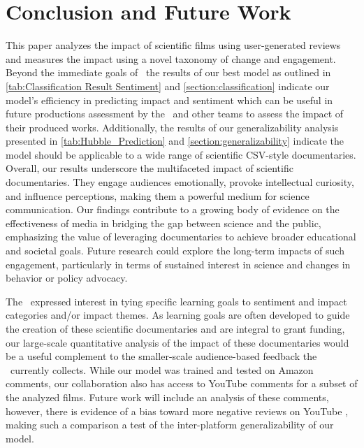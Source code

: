 
\section{Conclusion and Future Work}
This paper analyzes the impact of scientific films using user-generated reviews and measures the impact using a novel taxonomy of change and engagement. 
Beyond the immediate goals of \avlshort\ the results of our best model as outlined in \autoref{tab:Classification Result Sentiment} and \autoref{section:classification} indicate our model's efficiency in predicting impact and sentiment which can be useful in future productions assessment by the \avlshort\ and other teams to assess the impact of their produced works. Additionally, the results of our generalizability analysis presented in \autoref{tab:Hubble_Prediction} and \autoref{section:generalizability} indicate the model should be applicable to a wide range of scientific CSV-style documentaries.
Overall, our results underscore the multifaceted impact of scientific documentaries. They engage audiences emotionally, provoke intellectual curiosity, and influence perceptions, making them a powerful medium for science communication. Our findings contribute to a growing body of evidence on the effectiveness of media in bridging the gap between science and the public, emphasizing the value of leveraging documentaries to achieve broader educational and societal goals. Future research could explore the long-term impacts of such engagement, particularly in terms of sustained interest in science and changes in behavior or policy advocacy.

The \avlshort\ expressed interest in tying specific learning goals to sentiment and impact categories and/or impact themes.
As learning goals are often developed to guide the creation of these scientific documentaries and are integral to grant funding, our large-scale quantitative analysis of the impact of these documentaries would be a useful complement to the smaller-scale audience-based feedback the \avlshort\ currently collects.
While our model was trained and tested on Amazon comments, our collaboration also has access to YouTube comments for a subset of the analyzed films. Future work will include an analysis of these comments, however, there is evidence of a bias toward more negative reviews on YouTube \citep[e.g.][]{ardestani2024youtube}, making such a comparison a test of the inter-platform generalizability of our model.

